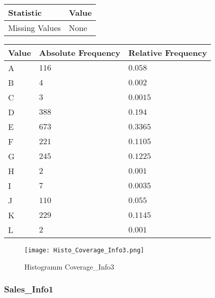 \begin{table}[H]
	\renewcommand{\arraystretch}{1.25}
	\begin{tabular}{l|l}
		\textbf{Statistic} & \textbf{Value}\\\hline
		Missing Values& None\\\hline
	\end{tabular}
\end{table}
\begin{table}[H]
	\renewcommand{\arraystretch}{1.25}
	\begin{tabular}{l|l|l}
		\textbf{Value} & \textbf{Absolute Frequency} & \textbf{Relative Frequency}\\\hline
		A&$116$&$0.058$\\\hline
		B&$4$&$0.002$\\\hline
		C&$3$&$0.0015$\\\hline
		D&$388$&$0.194$\\\hline
		E&$673$&$0.3365$\\\hline
		F&$221$&$0.1105$\\\hline
		G&$245$&$0.1225$\\\hline
		H&$2$&$0.001$\\\hline
		I&$7$&$0.0035$\\\hline
		J&$110$&$0.055$\\\hline
		K&$229$&$0.1145$\\\hline
		L&$2$&$0.001$
	\end{tabular}
\end{table}
\begin{figure}[H]
	\begin{center}
		\texttt{[image: Histo\_Coverage\_Info3.png]}
	\end{center}
	\caption{Histogramm Coverage\_Info3}
\end{figure}

\pagebreak
\subsubsection{Sales\_Info1}

